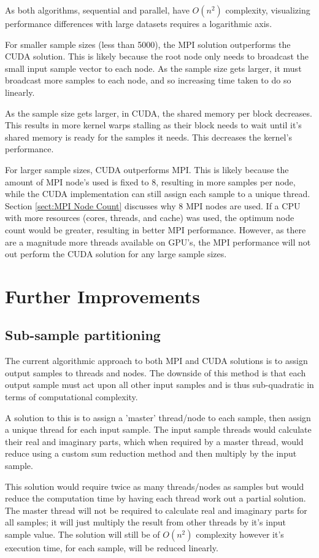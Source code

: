\documentclass[11pt,a4paper]{article}
\begin{document}
As both algorithms, sequential and parallel, have $O(n^2)$ complexity, visualizing performance differences with large datasets requires a logarithmic axis.

For smaller sample sizes (less than 5000), the MPI solution outperforms the CUDA solution. This is likely because the root node only needs to broadcast the small input sample vector to each node. As  the sample size gets larger, it must broadcast more samples to each node, and so increasing time taken to do so linearly. 

As the sample size gets larger, in CUDA, the shared memory per block decreases. This results in more kernel warps stalling as their block needs to wait until it's shared memory is ready for the samples it needs. This decreases the kernel's performance. 

For larger sample sizes, CUDA outperforms MPI. This is likely because the amount of MPI node's used is fixed to 8, resulting in more samples per node, while the CUDA implementation can still assign each sample to a unique thread. Section \ref{sect:MPI Node Count} discusses why 8 MPI nodes are used. If a CPU with more resources (cores, threads, and cache) was used, the optimum node count would be greater, resulting in better MPI performance. However, as there are a magnitude more threads available on GPU's, the MPI performance will not out perform the CUDA solution for any large sample sizes.

\section{Further Improvements}\label{sect:improvements}
\subsection{Sub-sample partitioning}
The current algorithmic approach to both MPI and CUDA solutions is to assign output samples to threads and nodes. The downside of this method is that each output sample must act upon all other input samples and is thus sub-quadratic in terms of computational complexity.

A solution to this is to assign a 'master' thread/node to each sample, then assign a unique thread for each input sample. The input sample threads would calculate their real and imaginary parts, which when required by a master thread, would reduce using a custom sum reduction method and then multiply by the input sample.

This solution would require twice as many threads/nodes as samples but would reduce the computation time by having each thread work out a partial solution. The master thread will not be required to calculate real and imaginary parts for all samples; it will just multiply the result from other threads by it's input sample value. The solution will still be of $O(n^2)$ complexity however it's execution time, for each sample, will be reduced linearly.
\end{document}
